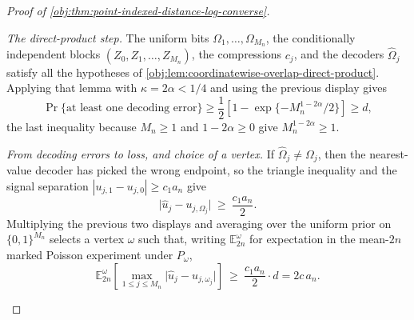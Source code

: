 \documentclass[11pt]{article}
\begin{document}
\begin{proof}[Proof of \cref{obj:thm:point-indexed-distance-log-converse}]
\begin{enumerate}
\emph{The direct-product step.}  The uniform bits \(\Omega_1,\ldots,\Omega_{M_n}\), the conditionally independent blocks \((Z_0,Z_1,\ldots,Z_{M_n})\), the compressions \(c_j\), and the decoders \(\widehat\Omega_j\) satisfy all the hypotheses of \cref{obj:lem:coordinatewise-overlap-direct-product}.  Applying that lemma with \(\kappa=2\alpha<1/4\) and using the previous display gives
\[
\Pr\{\text{at least one decoding error}\}
\ge
\frac12\left[1-\exp\{-M_n^{1-2\alpha}/2\}\right]
\ge d,
\]
the last inequality because \(M_n\ge1\) and \(1-2\alpha\ge0\) give \(M_n^{1-2\alpha}\ge1\).

\emph{From decoding errors to loss, and choice of a vertex.}  If \(\widehat\Omega_j\ne\Omega_j\), then the nearest-value decoder has picked the wrong endpoint, so the triangle inequality and the signal separation \(|u_{j,1}-u_{j,0}|\ge c_1a_n\) give
\[
\bigl|\widehat u_j-u_{j,\Omega_j}\bigr|\ \ge\ \frac{c_1a_n}{2}.
\]
Multiplying the previous two displays and averaging over the uniform prior on \(\{0,1\}^{M_n}\) selects a vertex \(\omega\) such that, writing \(\mathbb E^{\omega}_{2n}\) for expectation in the mean-\(2n\) marked Poisson experiment under \(P_\omega\),
\[
\mathbb E^{\omega}_{2n}\!\left[\max_{1\le j\le M_n}\bigl|\widehat u_j-u_{j,\omega_j}\bigr|\right]
\ \ge\
\frac{c_1a_n}{2}\cdot d
=
2c\,a_n .
\]


\end{enumerate}
\end{proof}
\end{document}
